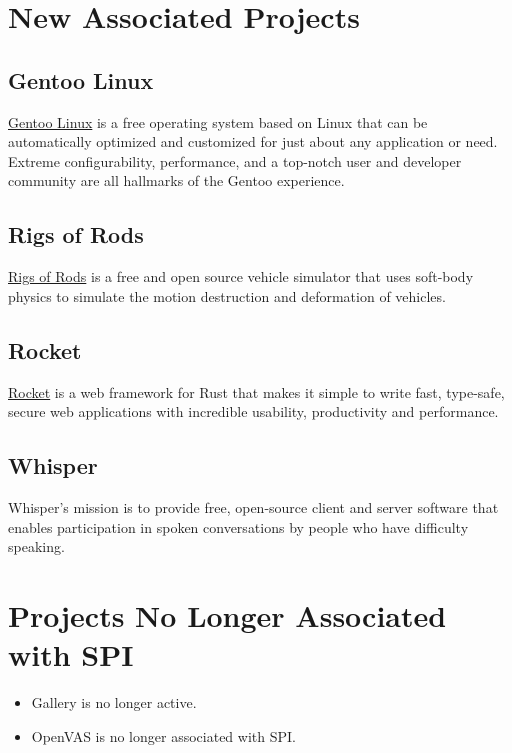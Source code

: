 \documentclass[a4paper]{report}
\begin{document}
\section{New Associated Projects}

\subsection{Gentoo Linux}

\href{https://www.gentoo.org/}{Gentoo Linux} is a free operating system based on Linux that can be automatically optimized and customized for just about any application or need. Extreme configurability, performance, and a top-notch user and developer community are all hallmarks of the Gentoo experience.

\subsection{Rigs of Rods}

\href{https://www.rigsofrods.org/}{Rigs of Rods} is a free and open source vehicle simulator that uses soft-body physics to simulate the motion destruction and deformation of vehicles.

\subsection{Rocket}

\href{https://rocket.rs/}{Rocket} is a web framework for Rust that makes it simple to write fast, type-safe, secure web applications with incredible usability, productivity and performance.

\subsection{Whisper}

Whisper's mission is to provide free, open-source client and server software that enables participation in spoken conversations by people who have difficulty speaking.

\section{Projects No Longer Associated with SPI}

\begin{itemize}

\item Gallery is no longer active.

\item OpenVAS is no longer associated with SPI.

\end{itemize}
\end{document}

